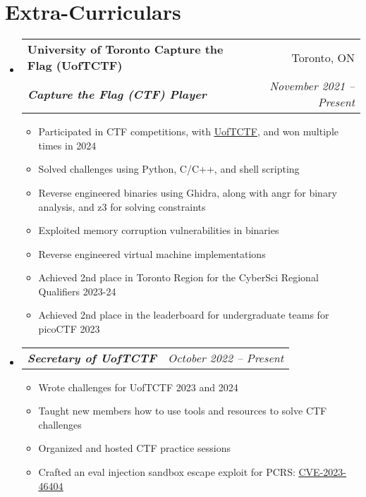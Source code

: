 \documentclass[letterpaper,11pt]{article}
\makeatletter
\newcommand{\resumeItem}[1]{
  \item\small{
    {#1 \vspace{-2pt}}
  }
}
\newcommand{\resumeSubheading}[4]{
  \vspace{-2pt}\item
    \begin{tabular*}{0.97\textwidth}[t]{l@{\extracolsep{\fill}}r}
      \textbf{#1} & #2 \\
      \textit{\small#3} & \textit{\small #4} \\
    \end{tabular*}\vspace{-7pt}
}
\newcommand{\resumeSubSubheading}[2]{
    \item
    \begin{tabular*}{0.97\textwidth}{l@{\extracolsep{\fill}}r}
      \textit{\small#1} & \textit{\small #2} \\
    \end{tabular*}\vspace{-7pt}
}
\newcommand{\resumeSubHeadingListStart}{\begin{itemize}[leftmargin=0.15in, label={}]}
\newcommand{\resumeSubHeadingListEnd}{\end{itemize}}
\newcommand{\resumeItemListStart}{\begin{itemize}}
\newcommand{\resumeItemListEnd}{\end{itemize}\vspace{-5pt}}
\makeatother
\begin{document}
\section{Extra-Curriculars}
  \resumeSubHeadingListStart
    \resumeSubheading
      {University of Toronto Capture the Flag (UofTCTF)}{Toronto, ON}
      {\bf{Capture the Flag (CTF) Player}}{November 2021 -- Present}
      \resumeItemListStart
        \resumeItem{Participated in CTF competitions, with \href{https://ctftime.org/team/139261/}{\underline{UofTCTF}}, and won multiple times in 2024}
        \resumeItem{Solved challenges using Python, C/C++, and shell scripting}
        \resumeItem{Reverse engineered binaries using Ghidra, along with angr for binary analysis, and z3 for solving constraints}
        \resumeItem{Exploited memory corruption vulnerabilities in binaries}
        \resumeItem{Reverse engineered virtual machine implementations}
        \resumeItem{Achieved 2nd place in Toronto Region for the CyberSci Regional Qualifiers 2023-24}
        \resumeItem{Achieved 2nd place in the leaderboard for undergraduate teams for picoCTF 2023}
      \resumeItemListEnd

  \resumeSubSubheading
    {\bf{Secretary of UofTCTF}}{October 2022 -- Present}
    \resumeItemListStart
      \resumeItem{Wrote challenges for UofTCTF 2023 and 2024}
      \resumeItem{Taught new members how to use tools and resources to solve CTF challenges}
      \resumeItem{Organized and hosted CTF practice sessions}
      \resumeItem{Crafted an eval injection sandbox escape exploit for PCRS: \href{https://github.com/windecks/CVE-2023-46404}{\underline{CVE-2023-46404}}}
    \resumeItemListEnd


  \resumeSubHeadingListEnd
\end{document}
